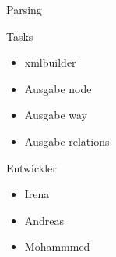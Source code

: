 \documentclass{beamer}
\begin{document}
\begin{frame}{Parsing}
    \begin{block}{Tasks}
        \begin{itemize}
        \item xmlbuilder
        \item Ausgabe node
        \item Ausgabe way
        \item Ausgabe relations
        \end{itemize}
    \end{block}
    \begin{block}{Entwickler}
        \begin{itemize}
        \item Irena
        \item Andreas
        \item Mohammmed
        \end{itemize}
    \end{block}

\end{frame}
\end{document}
